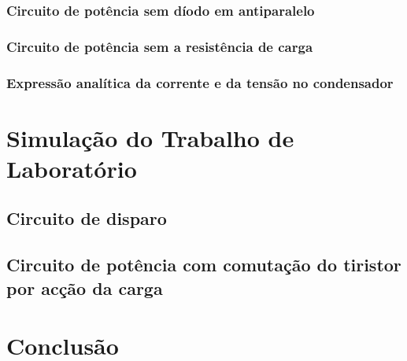 \documentclass[a4paper,11pt]{article}
\numberwithin{equation}{section}
\begin{document}
\subsubsection{Circuito de potência sem díodo em antiparalelo}

\subsubsection{Circuito de potência sem a resistência de carga}

\subsubsection{Expressão analítica da corrente e da tensão no condensador}

\pagebreak

\section{Simulação do Trabalho de Laboratório}

\subsection{Circuito de disparo}

\subsection{Circuito de potência com comutação do tiristor por acção da carga}

\pagebreak

\section{Conclusão}
\end{document}
